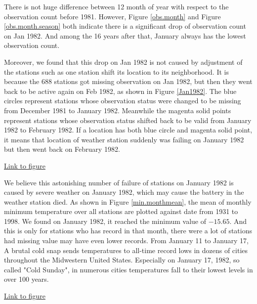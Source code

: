 There is not huge difference between 12 month of year with respect to the 
observation count before 1981. However, Figure 
\href{../plots/obs_month.pdf}{\ref*{obs.month}} and 
Figure \href{../plots/obs_month_byseason.pdf}{\ref*{obs.month.season}} both 
indicate there is a significant drop of observation count on Jan 1982. And among 
the 16 years after that, January always has the lowest observation count.

Moreover, we found that this drop on Jan 1982 is not caused by adjustment of 
the stations such as one station shift its location to its neighborhood. It is
because the 688 stations got missing observation on Jan 1982, but then they
went back to be active again on Feb 1982, as shown in Figure 
\href{../plots/obs_Jan1982.pdf}{\ref*{Jan1982}}. The blue circles represent 
stations whose observation status were changed to be missing from December 1981
to January 1982. Meanwhile the magenta solid points represent stations whose
observation status shifted back to be valid from January 1982 to February 1982.
If a location has both blue circle and magenta solid point, it means that location
of weather station suddenly was failing on January 1982 but then went back on
February 1982. 

\begin{framed}
\begin{center}
  \href{../plots/obs_Jan1982.pdf}{Link to figure}
  \label{Jan1982}
\end{center}
\end{framed}

We believe this astonishing number of failure of stations on January 1982 is caused
by severe weather on January 1982, which may cause the battery in the weather 
station died. As shown in Figure \href{../plots/monthmean.pdf}{\ref*{min.monthmean}},
the mean of monthly minimum temperature over all stations are plotted against 
date from 1931 to 1998. We found on January 1982, it reached the minimum value 
of $-15.65$. And this is only for stations who has record in that month, there 
were a lot of stations had missing value may have even lower records.  
From January 11 to January 17, A brutal cold snap sends temperatures to all-time 
record lows in dozens of cities throughout the Midwestern United States. Especially
on January 17, 1982, so called "Cold Sunday"\cite{coldsunday}, in numerous cities 
temperatures fall to their lowest levels in over 100 years.

\begin{framed}
\begin{center}
  \href{../plots/monthmean.pdf}{Link to figure}
  \label{min.monthmean}
\end{center}
\end{framed}

